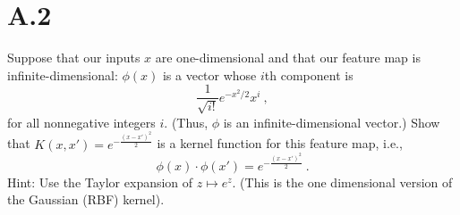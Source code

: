 \documentclass{article}
\newcommand{\1}{\mathbf{1}}
\begin{document}
\section*{A.2}
{\Large

Suppose that our inputs $x$ are one-dimensional and that our feature map is infinite-dimensional: 
$\phi( x) $ is a vector whose $i$th component is \\
\[
    \frac{1}{\sqrt{i!}} e^{-x^2/2}x^i\ ,
\]
for all nonnegative integers $i$. (Thus, $\phi$ is an infinite-dimensional vector.)
Show that $K(x, x') = e^{-\frac{(x-x')^2}{2}}$ is a kernel function for this feature map, i.e., \\
\[
    \phi (x) \cdot \phi (x') = e^{-\frac{(x-x')^2}{2}}\ .
\]
Hint: Use the Taylor expansion of $z \mapsto e^z$.
(This is the one dimensional version of the Gaussian  (RBF) kernel).\\

}
\end{document}
